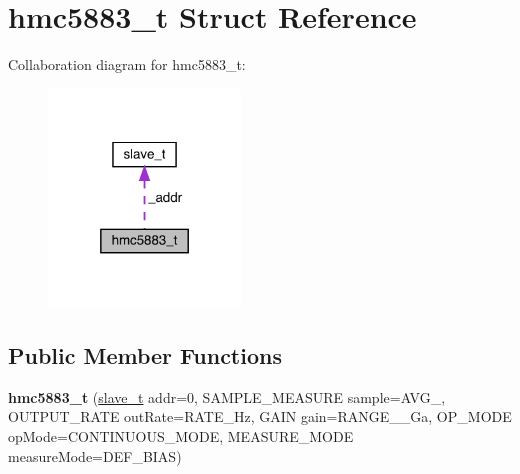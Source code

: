 \hypertarget{structhmc5883__t}{}\section{hmc5883\+\_\+t Struct Reference}
\label{structhmc5883__t}


Collaboration diagram for hmc5883\+\_\+t\+:\nopagebreak
\begin{figure}[H]
\begin{center}
\leavevmode
\includegraphics[width=145pt]{structhmc5883__t__coll__graph}
\end{center}
\end{figure}
\subsection*{Public Member Functions}
\begin{DoxyCompactItemize}
\item 
\mbox{\label{structhmc5883__t_ada60b7eb8c551a11403cac80c69ad222}} 
{\bfseries hmc5883\+\_\+t} (\hyperlink{structslave__t}{slave\+\_\+t} addr=0, S\+A\+M\+P\+L\+E\+\_\+\+M\+E\+A\+S\+U\+RE sample=A\+V\+G\+\_, O\+U\+T\+P\+U\+T\+\_\+\+R\+A\+TE out\+Rate=R\+A\+T\+E\+\_\+Hz, G\+A\+IN gain=R\+A\+N\+G\+E\+\_\+\_\+Ga, O\+P\+\_\+\+M\+O\+DE op\+Mode=C\+O\+N\+T\+I\+N\+U\+O\+U\+S\+\_\+\+M\+O\+DE, M\+E\+A\+S\+U\+R\+E\+\_\+\+M\+O\+DE measure\+Mode=D\+E\+F\+\_\+\+B\+I\+AS)
\end{DoxyCompactItemize}
